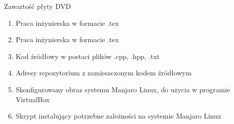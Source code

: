 \cleardoublepage
{}
\thispagestyle{plain}

{}

Zawartość płyty DVD
\begin{enumerate}
\item Praca inżynierska w formacie .tex
\item Praca inżynierska w formacie .tex
\item Kod źródłowy w postaci plików .cpp, .hpp, .txt
\item Adresy repozytorium z zamieszczonym kodem źródłowym
\item Skonfigurowany obraz systemu Manjaro Linux, do użycia w programie VirtualBox
\item Skrypt instalujący potrzebne zależności na systemie Manjaro Linux
\end{enumerate}
